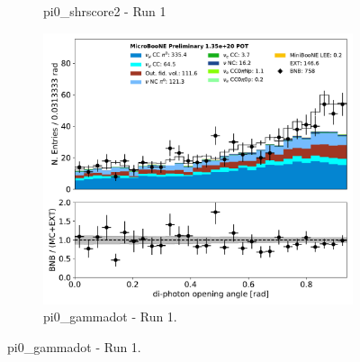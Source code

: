 \documentclass[a4paper]{article}
\begin{document}
\begin{figure}[H]
\begin{center}
\begin{subfigure}[b]{0.3\textwidth}
    \caption{\label{fig:pi0:inputs:shrscore2:RUN1} pi0\_shrscore2 - Run 1 }
    \end{subfigure}
    \begin{subfigure}[b]{0.3\textwidth}
    \centering
    \includegraphics[width=1.00\textwidth]{pi0/pi0_gammadot_01152020_inputs_RUN1.pdf}
    \caption{\label{fig:pi0:inputs:gammadot:RUN1} pi0\_gammadot - Run 1.}
    \end{subfigure}
\end{center}
\end{figure}
\end{document}
